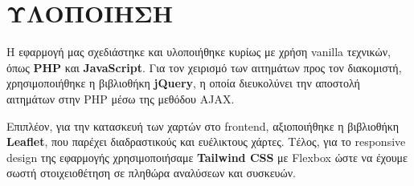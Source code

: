 \chapter{ΥΛΟΠΟΙΗΣΗ}
    Η εφαρμογή μας σχεδιάστηκε και υλοποιήθηκε κυρίως με χρήση vanilla τεχνικών, όπως \textbf{PHP} και \textbf{JavaScript}.
    Για τον χειρισμό των αιτημάτων προς τον διακομιστή, χρησιμοποιήθηκε η βιβλιοθήκη \textbf{jQuery}, η οποία διευκολύνει την αποστολή αιτημάτων στην PHP μέσω της μεθόδου AJAX.

    Επιπλέον, για την κατασκευή των χαρτών στο frontend, αξιοποιήθηκε η βιβλιοθήκη \textbf{Leaflet}, που παρέχει διαδραστικούς και ευέλικτους χάρτες.
    Τέλος, για το responsive design της εφαρμογής χρησιμοποιήσαμε \textbf{Tailwind CSS} με Flexbox ώστε να έχουμε σωστή στοιχειοθέτηση σε πληθώρα αναλύσεων και συσκευών.
